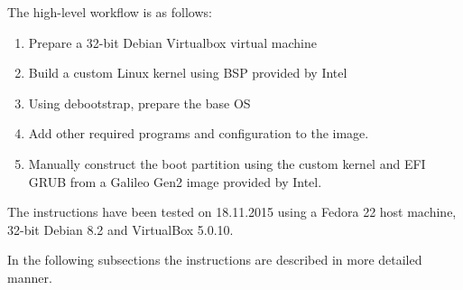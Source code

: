 \documentclass[a4paper,11pt]{article}
\begin{document}
The high-level workflow is as follows:
\begin{enumerate}
\label{galileodebianhighlevel}
\item Prepare a 32-bit Debian Virtualbox virtual machine
\item Build a custom Linux kernel using BSP provided by Intel
\item Using debootstrap, prepare the base OS
\item Add other required programs and configuration to the image.
\item Manually construct the boot partition using the custom kernel and EFI GRUB from a Galileo Gen2 image provided by Intel.
\end{enumerate}

The instructions have been tested on 18.11.2015 using a Fedora 22 host machine, 32-bit Debian 8.2 and VirtualBox 5.0.10.

In the following subsections the instructions are described in more detailed manner.
\end{document}
